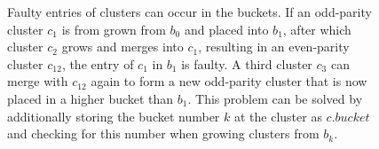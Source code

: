 \begin{figure}[htbp]

    \caption{Faulty entries of clusters can occur in the buckets. If an odd-parity cluster $c_1$ is from grown from $b_0$ and placed into $b_1$, after which cluster $c_2$ grows and merges into $c_1$, resulting in an even-parity cluster $c_{12}$, the entry of $c_1$ in $b_1$ is faulty. A third cluster $c_3$ can merge with $c_{12}$ again to form a new odd-parity cluster that is now placed in a higher bucket than $b_1$. This problem can be solved by additionally storing the bucket number $k$ at the cluster as $c.bucket$ and checking for this number when growing clusters from $b_k$.}\label{3.fig.clustermergeB}
\end{figure}

